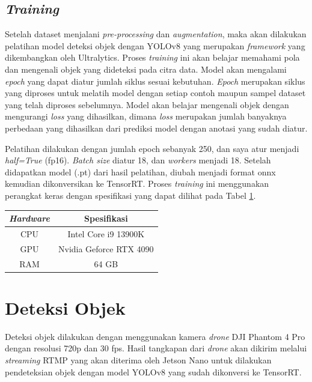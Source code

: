 \subsection{\emph{Training}}
Setelah dataset menjalani \emph{pre-processing} dan \emph{augmentation}, maka akan dilakukan pelatihan model deteksi objek dengan YOLOv8 yang merupakan \emph{framework} yang dikembangkan oleh Ultralytics. Proses \emph{training} ini akan belajar memahami pola dan mengenali objek yang dideteksi pada citra data. Model akan mengalami \emph{epoch} yang dapat diatur jumlah siklus sesuai kebutuhan. \emph{Epoch} merupakan siklus yang diproses untuk melatih model dengan setiap contoh maupun sampel dataset yang telah diproses sebelumnya. Model akan belajar mengenali objek dengan mengurangi \emph{loss} yang dihasilkan, dimana \emph{loss} merupakan jumlah banyaknya perbedaan yang dihasilkan dari prediksi model dengan anotasi yang sudah diatur. 

Pelatihan dilakukan dengan jumlah epoch sebanyak 250, dan saya atur menjadi \emph{half=True} (fp16). \emph{Batch size} diatur 18, dan \emph{workers} menjadi 18. Setelah didapatkan model (.pt) dari hasil pelatihan, diubah menjadi format onnx kemudian dikonversikan ke TensorRT. Proses \emph{training} ini menggunakan perangkat keras dengan spesifikasi yang dapat dilihat pada Tabel \ref{tbl:specpc}.

  \begin{table}[h!]
    \centering
    \label{tbl:specpc}
    \begin{tabular}{|c|c|}
      \hline
      \rowcolor[gray]{0.9}
      \textbf{\emph{Hardware}} & \textbf{Spesifikasi} \\ \hline
      CPU               & Intel Core i9 13900K \\ \hline
      GPU               & Nvidia Geforce RTX 4090 \\ \hline
      RAM               & 64 GB \\ \hline
    \end{tabular}
  \end{table}
 
\section{Deteksi Objek}
Deteksi objek dilakukan dengan menggunakan kamera \emph{drone} DJI Phantom 4 Pro dengan resolusi 720p dan 30 fps. Hasil tangkapan dari \emph{drone} akan dikirim melalui \emph{streaming} RTMP yang akan diterima oleh Jetson Nano untuk dilakukan pendeteksian objek dengan model YOLOv8 yang sudah dikonversi ke TensorRT.

